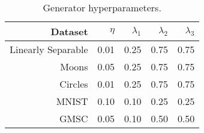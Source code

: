 \begin{table}

\caption{Generator hyperparameters. \label{tab:genparams} \newline}
\centering
\fontsize{8}{10}\selectfont
\begin{tabular}[t]{rrrrr}
\toprule
Dataset & $\eta$ & $\lambda_1$ & $\lambda_2$ & $\lambda_3$\\
\midrule
Linearly Separable & 0.01 & 0.25 & 0.75 & 0.75\\
Moons & 0.05 & 0.25 & 0.75 & 0.75\\
Circles & 0.01 & 0.25 & 0.75 & 0.75\\
MNIST & 0.10 & 0.10 & 0.25 & 0.25\\
GMSC & 0.05 & 0.10 & 0.50 & 0.50\\
\bottomrule
\end{tabular}
\end{table}
